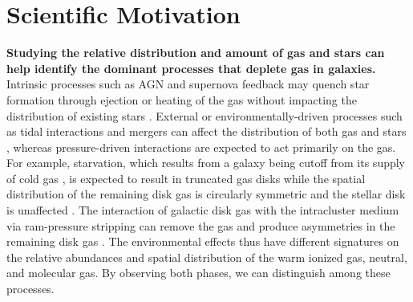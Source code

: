 \documentclass[11pt, preprint]{aastex}
\newcommand{\ha}{$H\alpha$}
\begin{document}

\vspace*{-1cm}
\section{Scientific Motivation}
\vspace*{-.4cm}


%
%

{\bf Studying the relative distribution
and amount of gas and stars can help identify the dominant processes
that deplete gas in galaxies. }
Intrinsic processes such as AGN and supernova feedback may quench star formation through
ejection or heating of the gas without impacting the distribution of
existing stars \citep[e.g.][]{springel05,
  croton06, dekel06}.  External or environmentally-driven processes 
such as tidal interactions and
mergers can
affect the distribution of both gas and stars \citep{springel05,
  croton06, dekel06}, whereas pressure-driven interactions are expected to
act primarily on the gas.  For example, starvation, which results from
a galaxy being cutoff from its supply of cold gas \citep{Larson80}, is
expected to result in
truncated gas disks while the spatial distribution of the
remaining disk gas is circularly symmetric and the stellar disk is unaffected \citep[e.g.][]{kawata08}. 
The interaction of galactic disk gas with the intracluster medium via
ram-pressure stripping can remove the gas and produce asymmetries in
the remaining disk gas \citep[e.g.][]{quilis00,crowl05}.  
{The environmental effects thus
have different signatures on the relative abundances and spatial
distribution of the warm ionized gas, neutral, and molecular gas.  By
observing both 
phases, we can distinguish among these processes.}
 
\end{document}
